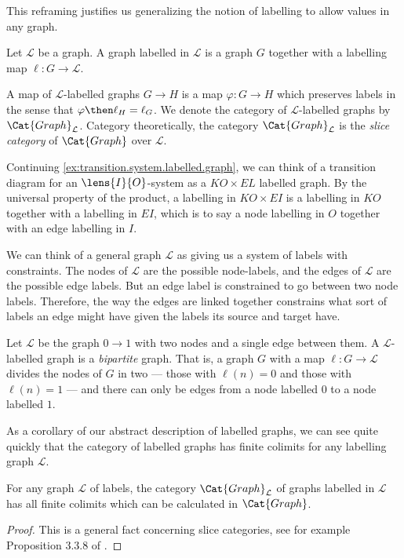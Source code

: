 \documentclass[DynamicalBook]{subfiles}
\begin{document}
This reframing justifies us generalizing the notion of labelling to allow values in any graph.
  \begin{definition}
Let $\mathcal{L}$ be a graph. A graph labelled in $\mathcal{L}$ is a graph $G$ together with a labelling map $\ell : G \to \mathcal{L}$.

A map of $\mathcal{L}$-labelled graphs $G \to H$ is a map $\varphi : G \to H$ which preserves labels in the sense that $\varphi \then \ell_{H} = \ell_{G}$. We denote the category of $\mathcal{L}$-labelled graphs by $\Cat{Graph}_{\mathcal{L}}$. Category theoretically, the category $\Cat{Graph}_{\mathcal{L}}$ is the \emph{slice category} of $\Cat{Graph}$ over $\mathcal{L}$.
    \end{definition}

      \begin{example}
Continuing \cref{ex:transition.system.labelled.graph}, we can think of a transition diagram for an $\lens{I}{O}$-system as a $KO \times EL$ labelled graph. By the universal property of the product, a labelling in $KO \times EI$ is a labelling in $KO$ together with a labelling in $EI$, which is to say a node labelling in $O$ together with an edge labelling in $I$.
        \end{example}

We can think of a general graph $\mathcal{L}$ as giving us a system of labels with constraints. The nodes of $\mathcal{L}$ are the possible node-labels, and the edges of $\mathcal{L}$ are the possible edge labels. But an edge label is constrained to go between two node labels. Therefore, the way the edges are linked together constrains what sort of labels an edge might have given the labels its source and target have.

    \begin{example}
Let $\mathcal{L}$ be the graph $0 \to 1$ with two nodes and a single edge between them. A $\mathcal{L}$-labelled graph is a \emph{bipartite} graph. That is, a graph $G$ with a map $\ell : G \to \mathcal{L}$ divides the nodes of $G$ in two --- those with $\ell(n) = 0$ and those with $\ell(n) = 1$ --- and there can only be edges from a node labelled $0$ to a node labelled $1$.
      \end{example}

As a corollary of our abstract description of labelled graphs, we can see quite quickly that the category of labelled graphs has finite colimits for any labelling graph $\mathcal{L}$.

\begin{proposition}\label{prop:colimits.labelled.graphs}
For any graph $\mathcal{L}$ of labels, the category $\Cat{Graph}_{\mathcal{L}}$ of graphs labelled in $\mathcal{L}$ has all finite colimits which can be calculated in $\Cat{Graph}$.
  \end{proposition}
  \begin{proof}
This is a general fact concerning slice categories, see for example Proposition 3.3.8 of \cite{Riehl:intro.to.cats}.
  \end{proof}
\end{document}
